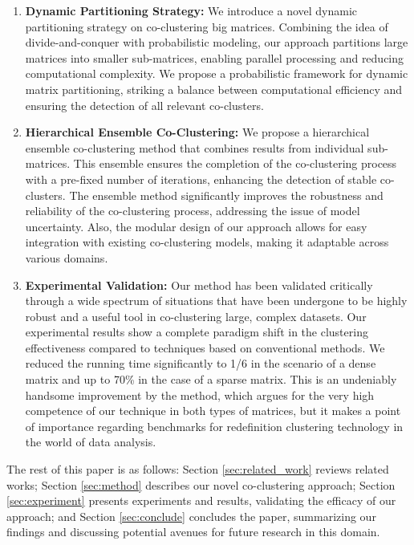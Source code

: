 \begin{enumerate}
    \item \textbf{Dynamic Partitioning Strategy:}
          We introduce a novel dynamic partitioning strategy on co-clustering big matrices.
          Combining the idea of divide-and-conquer with probabilistic modeling, our approach partitions large matrices into smaller sub-matrices, enabling parallel processing and reducing computational complexity.
          We propose a probabilistic framework for dynamic matrix partitioning, striking a balance between computational efficiency and ensuring the detection of all relevant co-clusters.
    \item \textbf{Hierarchical Ensemble Co-Clustering:}
          We propose a hierarchical ensemble co-clustering method that combines results from individual sub-matrices.
          This ensemble ensures the completion of the co-clustering process with a pre-fixed number of iterations, enhancing the detection of stable co-clusters.
          The ensemble method significantly improves the robustness and reliability of the co-clustering process, addressing the issue of model uncertainty.
          Also, the modular design of our approach allows for easy integration with existing co-clustering models, making it adaptable across various domains.
    \item \textbf{Experimental Validation:}
          Our method has been validated critically through a wide spectrum of situations that have been undergone to be highly robust and a useful tool in co-clustering large, complex datasets.
          Our experimental results show a complete paradigm shift in the clustering effectiveness compared to techniques based on conventional methods.
          We reduced the running time significantly to 1/6 in the scenario of a dense matrix and up to 70\% in the case of a sparse matrix.
          This is an undeniably handsome improvement by the method, which argues for the very high competence of our technique in both types of matrices, but it makes a point of importance regarding benchmarks for redefinition clustering technology in the world of data analysis.
\end{enumerate}

The rest of this paper is as follows: Section \ref{sec:related_work} reviews related works; Section \ref{sec:method} describes our novel co-clustering approach; Section \ref{sec:experiment} presents experiments and results, validating the efficacy of our approach; and Section \ref{sec:conclude} concludes the paper, summarizing our findings and discussing potential avenues for future research in this domain.
